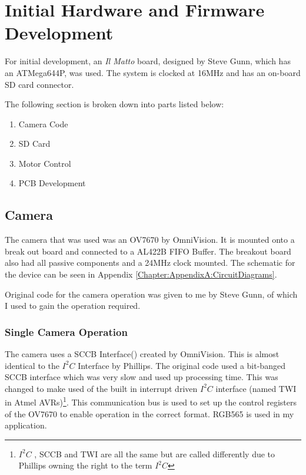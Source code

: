 \chapter{Initial Hardware and Firmware Development} \label{Chapter:HardwareDevelopment}
For initial development, an \textit{Il Matto} board, designed by Steve Gunn, which has an ATMega644P, was used. The system is clocked at 16MHz and has an on-board SD card connector. 

The following section is broken down into parts listed below:
\begin{enumerate}
\item Camera Code
\item SD Card
\item Motor Control
\item PCB Development
\end{enumerate}

\section{Camera}

The camera that was used was an OV7670 by OmniVision. It is mounted onto a break out board and connected to a AL422B FIFO Buffer. The breakout board also had all passive components and a 24MHz clock mounted. The schematic for the device can be seen in Appendix \ref{Chapter:AppendixA:CircuitDiagrams}.

Original code for the camera operation was given to me by Steve Gunn, of which I used to gain the operation required. 

\subsection{Single Camera Operation}

The camera uses a SCCB Interface(\cite{SCCB_Interface}) created by OmniVision. This is almost identical to the $I^{2}C$ Interface by Phillips. The original code used a bit-banged SCCB interface which was very slow and used up processing time. This was changed to make used of the built in interrupt driven $I^{2}C$ interface (named TWI in Atmel AVRs)\footnote{$I^{2}C$ , SCCB and TWI are all the same but are called differently due to Phillips owning the right to the term $I^{2}C$}. This communication bus is used to set up the control registers of the OV7670 to enable operation in the correct format. RGB565 is used in my application.

